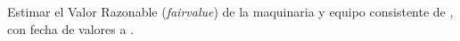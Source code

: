 Estimar el Valor Razonable (\textit{\gls{fairvalue}}) de la maquinaria y equipo consistente de \maquinariaEquipo, con fecha de valores a \fechaValores.
